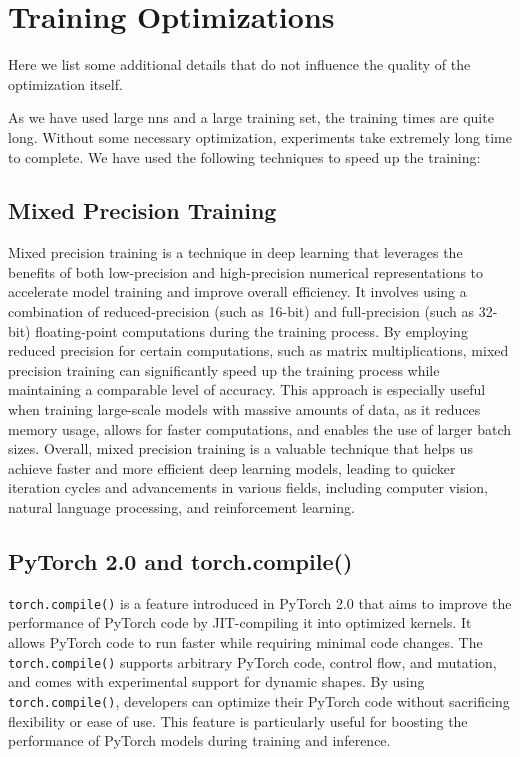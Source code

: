 \section{Training Optimizations}

Here we list some additional details that do not influence the quality of the optimization itself.

As we have used large \glspl{nn} and a large training set, the training times are quite long. Without some necessary
optimization, experiments take extremely long time to complete. We have used the following techniques to speed up the
training:

\subsection{Mixed Precision Training}

Mixed precision training is a technique in deep learning that leverages the benefits of both low-precision and
high-precision numerical representations to accelerate model training and improve overall efficiency. It involves using
a combination of reduced-precision (such as 16-bit) and full-precision (such as 32-bit) floating-point computations
during the training process. By employing reduced precision for certain computations, such as matrix multiplications,
mixed precision training can significantly speed up the training process while maintaining a comparable level of
accuracy. This approach is especially useful when training large-scale models with massive amounts of data, as it
reduces memory usage, allows for faster computations, and enables the use of larger batch sizes. Overall, mixed
precision training is a valuable technique that helps us achieve faster and more efficient deep learning models, leading
to quicker iteration cycles and advancements in various fields, including computer vision, natural language processing,
and reinforcement learning.


\subsection{PyTorch 2.0 and torch.compile()}

\verb|torch.compile()| is a feature introduced in PyTorch 2.0 \cite{pytorch} that aims to improve the performance of
PyTorch code by JIT-compiling it into optimized kernels. It allows PyTorch code to run faster while requiring minimal
code changes. The \verb|torch.compile()| supports arbitrary PyTorch code, control flow, and mutation, and comes with
experimental support for dynamic shapes. By using \verb|torch.compile()|, developers can optimize their PyTorch code
without sacrificing flexibility or ease of use.  This feature is particularly useful for boosting the performance of
PyTorch models during training and inference.

